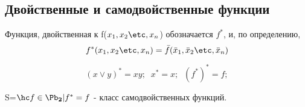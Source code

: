 \documentclass[unicode,10pt]{article}
\begin{document}
\subsection{Двойственные и самодвойственные функции}
\begin{df}
  Функция, двойственная к f($\set[x]{n}$) обозначается $f^*$, и, по определению,
  \begin{displaymath}
    f^*(\set[x]{n}) = \bar f(\set[\bar x]{n})
  \end{displaymath}
\end{df}
\begin{ex}
  \begin{displaymath}
    (x\vee y)^*=xy;\;\; x^*=x;\;\; (f^*)^*=f;
  \end{displaymath}
\end{ex}
\begin{df}
  S=$\setof{f\in\PD}{f^*=f}$ - класс самодвойственных функций.
\end{df}
\end{document}
